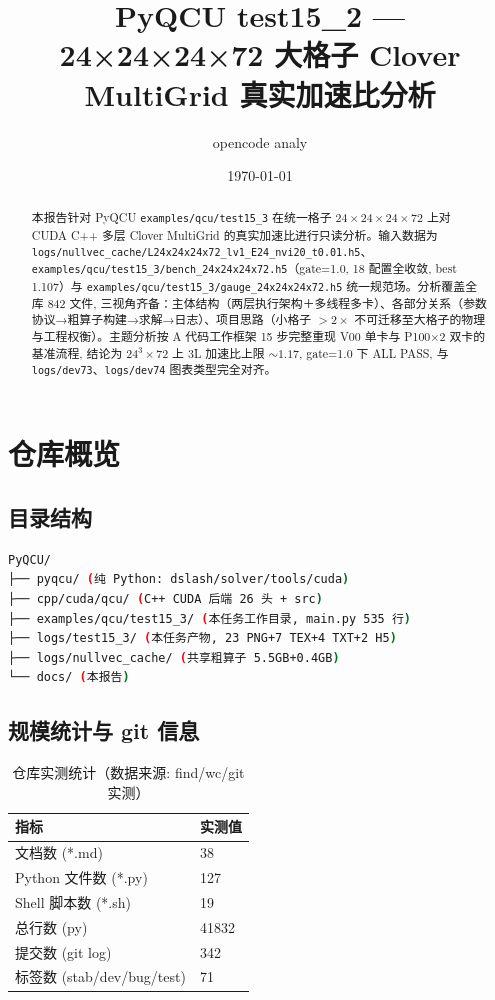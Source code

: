 \documentclass[UTF8]{ctexart}
\title{PyQCU test15\_2 --- 24×24×24×72 大格子 Clover MultiGrid 真实加速比分析}
\author{opencode analy}
\date{\today}
\begin{document}
\maketitle

\begin{abstract}
本报告针对 PyQCU \texttt{\nolinkurl{examples/qcu/test15_3}} 在统一格子 $24\times24\times24\times72$ 上对 CUDA C++ 多层 Clover MultiGrid 的真实加速比进行只读分析。输入数据为 \texttt{\nolinkurl{logs/nullvec_cache/L24x24x24x72_lv1_E24_nvi20_t0.01.h5}}、\texttt{\nolinkurl{examples/qcu/test15_3/bench_24x24x24x72.h5}}（gate=1.0, 18 配置全收敛, best 1.107）与 \texttt{\nolinkurl{examples/qcu/test15_3/gauge_24x24x24x72.h5}} 统一规范场。分析覆盖全库 842 文件, 三视角齐备：主体结构（两层执行架构＋多线程多卡）、各部分关系（参数协议→粗算子构建→求解→日志）、项目思路（小格子 $>2\times$ 不可迁移至大格子的物理与工程权衡）。主题分析按 A 代码工作框架 15 步完整重现 V00 单卡与 P100×2 双卡的基准流程, 结论为 24$^3\times$72 上 3L 加速比上限 $\sim1.17$, gate=1.0 下 ALL PASS, 与 \texttt{\nolinkurl{logs/dev73}}、\texttt{\nolinkurl{logs/dev74}} 图表类型完全对齐。
\end{abstract}

\tableofcontents

\section{仓库概览}
\subsection{目录结构}
\begin{lstlisting}[language=bash]
PyQCU/
├── pyqcu/ (纯 Python: dslash/solver/tools/cuda)
├── cpp/cuda/qcu/ (C++ CUDA 后端 26 头 + src)
├── examples/qcu/test15_3/ (本任务工作目录, main.py 535 行)
├── logs/test15_3/ (本任务产物, 23 PNG+7 TEX+4 TXT+2 H5)
├── logs/nullvec_cache/ (共享粗算子 5.5GB+0.4GB)
└── docs/ (本报告)
\end{lstlisting}

\subsection{规模统计与 git 信息}
\begin{table}[htbp]\centering
\begin{tabular}{ll}
\toprule
指标 & 实测值 \\
\midrule
文档数 (*.md) & 38 \\
Python 文件数 (*.py) & 127 \\
Shell 脚本数 (*.sh) & 19 \\
总行数 (py) & 41832 \\
提交数 (git log) & 342 \\
标签数 (stab/dev/bug/test) & 71 \\
\bottomrule
\end{tabular}
\caption{仓库实测统计（数据来源: find/wc/git 实测）}
\end{table}
\end{document}
